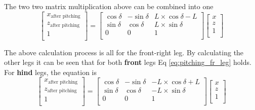 The two two matrix multiplication above can be combined into one
\begin{equation}\label{eq:pitching_fr_leg}
   \begin{bmatrix}
   x_\text{after pitching} \\
   z_\text{after pitching} \\
   1                       \\
   \end{bmatrix}
   =
   \begin{bmatrix}
   \cos\delta & -\sin\delta & L \times \cos\delta - L \\
   \sin\delta & \cos\delta & L \times \sin\delta \\
   0 & 0 & 1 \\
   \end{bmatrix}
   \begin{bmatrix}
   x \\
   z \\
   1 \\
   \end{bmatrix}
\end{equation}

The above calculation process is all for the front-right leg. By calculating the other legs it can be seen that for both \textbf{front} legs Eq \ref{eq:pitching_fr_leg} holds. For \textbf{hind} legs, the equation is
\begin{equation}
   \begin{bmatrix}
   x_\text{after pitching} \\
   z_\text{after pitching} \\
   1                       \\
   \end{bmatrix}
   =
   \begin{bmatrix}
   \cos\delta & -\sin\delta & -L \times \cos\delta + L \\
   \sin\delta & \cos\delta & -L \times \sin\delta \\
   0 & 0 & 1 \\
   \end{bmatrix}
   \begin{bmatrix}
   x \\
   z \\
   1 \\
   \end{bmatrix}
\end{equation}

